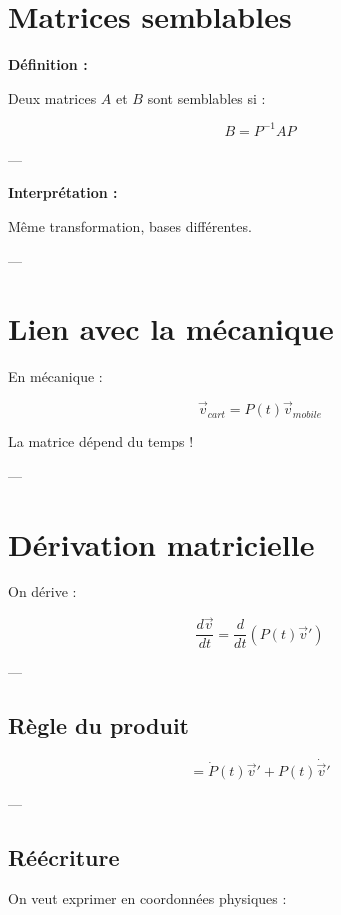 \documentclass[11pt,a4paper]{article}
\begin{document}
\section{Matrices semblables}

\textbf{Définition :}

Deux matrices $A$ et $B$ sont semblables si :

\[
B = P^{-1} A P
\]

---

\textbf{Interprétation :}

\begin{center}
Même transformation, bases différentes.
\end{center}

---

\section{Lien avec la mécanique}

En mécanique :

\[
\vec{v}_{cart} = P(t) \vec{v}_{mobile}
\]

 La matrice dépend du temps !

---

\section{Dérivation matricielle}

On dérive :

\[
\frac{d\vec{v}}{dt}
=
\frac{d}{dt}(P(t)\vec{v}')
\]

---

\subsection{Règle du produit}

\[
= \dot{P}(t)\vec{v}' + P(t)\dot{\vec{v}}'
\]

---

\subsection{Réécriture}

On veut exprimer en coordonnées physiques :
\end{document}
